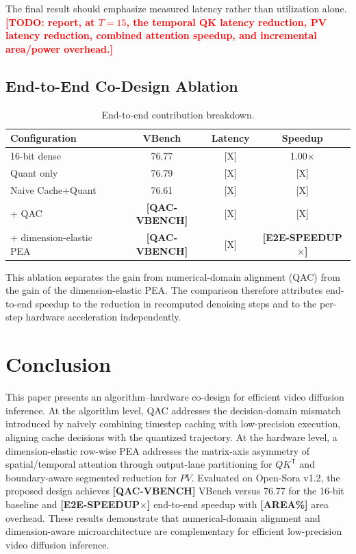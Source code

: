 \documentclass[conference]{IEEEtran}
\newcommand{\ModelName}{Open-Sora v1.2}
\newcommand{\BaselineVBench}{76.77}
\newcommand{\QuantOnlyVBench}{76.79}
\newcommand{\NaiveCQVBench}{76.61}
\newcommand{\QACVBench}{\textbf{[QAC-VBENCH]}}
\newcommand{\AreaOverhead}{\textbf{[AREA\%]}}
\newcommand{\EtoESpeedup}{\textbf{[E2E-SPEEDUP$\times$]}}
\newcommand{\TODO}[1]{\textcolor{red}{\textbf{[TODO: #1]}}}
\begin{document}
The final result should emphasize measured latency rather than utilization
alone. \TODO{report, at $T=15$, the temporal QK latency reduction, PV latency
reduction, combined attention speedup, and incremental area/power overhead.}

\subsection{End-to-End Co-Design Ablation}

\begin{table}[t]
\centering
\caption{End-to-end contribution breakdown.}
\label{tab:ablation}
\setlength{\tabcolsep}{3.0pt}
\begin{tabular}{lccc}
\toprule
Configuration & VBench & Latency & Speedup \\
\midrule
16-bit dense & \BaselineVBench & [X] & 1.00$\times$ \\
Quant only & \QuantOnlyVBench & [X] & [X] \\
Naive Cache+Quant & \NaiveCQVBench & [X] & [X] \\
+ QAC & \QACVBench & [X] & [X] \\
+ dimension-elastic PEA & \QACVBench & [X] & \EtoESpeedup \\
\bottomrule
\end{tabular}
\end{table}

This ablation separates the gain from numerical-domain alignment (QAC) from
the gain of the dimension-elastic PEA. The comparison therefore attributes
end-to-end speedup to the reduction in recomputed denoising steps and to the
per-step hardware acceleration independently.

\section{Conclusion}
\label{sec:conclusion}

This paper presents an algorithm--hardware co-design for efficient video
diffusion inference. At the algorithm level, QAC addresses the
decision-domain mismatch introduced by naively combining timestep caching
with low-precision execution, aligning cache decisions with the quantized
trajectory. At the hardware level, a dimension-elastic row-wise PEA addresses
the matrix-axis asymmetry of spatial/temporal attention through output-lane
partitioning for $QK^{\mathsf T}$ and boundary-aware segmented reduction for
$PV$. Evaluated on \ModelName{}, the proposed design achieves
\QACVBench{} VBench versus \BaselineVBench{} for the 16-bit baseline and
\EtoESpeedup{} end-to-end speedup with \AreaOverhead{} area overhead. These
results demonstrate that numerical-domain alignment and dimension-aware
microarchitecture are complementary for efficient low-precision video
diffusion inference.



\end{document}
